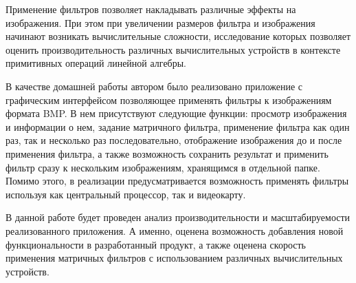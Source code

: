 
Применение фильтров позволяет накладывать различные эффекты на изображения.
При этом при увеличении размеров фильтра и изображения начинают возникать вычислительные сложности,
исследование которых позволяет оценить производительность различных вычислительных устройств в 
контексте примитивных операций линейной алгебры.

В качестве домашней работы автором было реализовано приложение с графическим интерфейсом позволяющее 
применять фильтры к изображениям формата BMP. В нем присутствуют следующие функции: просмотр изображения 
и информации о нем, задание матричного фильтра, применение фильтра как один раз, так и несколько раз 
последовательно, отображение изображения до и после применения фильтра, а также возможность сохранить 
результат и применить фильтр сразу к нескольким изображениям, хранящимся в отдельной папке.
Помимо этого, в реализации предусматривается возможность применять фильтры используя как центральный 
процессор, так и видеокарту.

В данной работе будет проведен анализ производительности и масштабируемости реализованного приложения. 
А именно, оценена возможность добавления новой функциональности в разработанный продукт, а также оценена 
скорость применения матричных фильтров с использованием различных вычислительных устройств. 

\pagebreak
